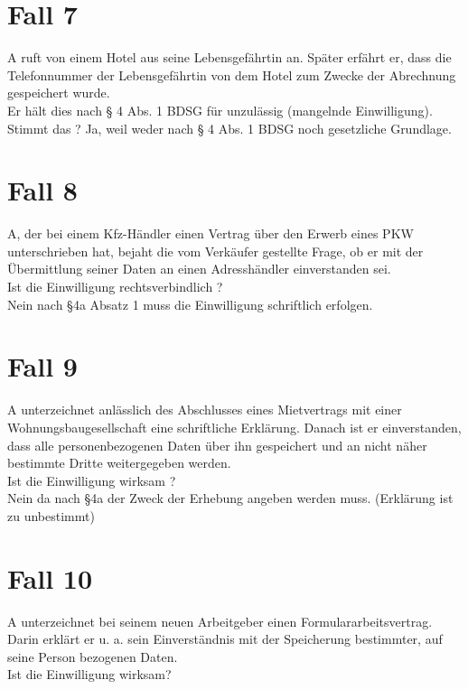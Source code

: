 \documentclass[a4paper,10pt]{scrartcl}
\begin{document}
\section{Fall 7}

A ruft von einem Hotel aus seine Lebensgefährtin an. Später erfährt 
er, dass die Telefonnummer der Lebensgefährtin von dem Hotel 
zum Zwecke der Abrechnung gespeichert wurde.\\
Er hält dies nach § 4 Abs. 1 BDSG für unzulässig 
(mangelnde Einwilligung).\\

Stimmt das ?
Ja, weil weder nach § 4 Abs. 1 BDSG noch gesetzliche 
Grundlage.

\section{Fall 8}

A, der bei einem Kfz-Händler einen Vertrag über den 
Erwerb eines PKW unterschrieben hat, bejaht die vom 
Verkäufer gestellte Frage, ob er mit der Übermittlung 
seiner Daten an einen Adresshändler einverstanden sei.\\ 

Ist die Einwilligung rechtsverbindlich ?\\

Nein nach §4a Absatz 1 muss die Einwilligung schriftlich erfolgen.

\section{Fall 9}

A unterzeichnet anlässlich des Abschlusses eines
Mietvertrags mit einer Wohnungsbaugesellschaft eine 
schriftliche Erklärung. Danach ist er einverstanden, dass 
alle personenbezogenen Daten über ihn gespeichert und 
an nicht näher bestimmte Dritte weitergegeben werden.\\

Ist die Einwilligung wirksam ?\\

Nein da nach §4a der Zweck der Erhebung angeben werden muss. (Erklärung ist zu unbestimmt)

\section{Fall 10}

A unterzeichnet bei seinem neuen Arbeitgeber einen
Formulararbeitsvertrag. Darin erklärt er u. a. sein 
Einverständnis mit der Speicherung bestimmter, auf seine 
Person bezogenen Daten.\\
Ist die Einwilligung wirksam?\\
\end{document}
